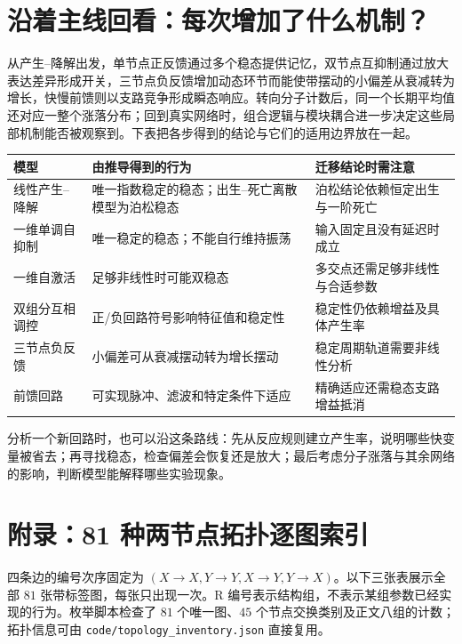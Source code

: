 \documentclass[11pt,a4paper,UTF8,fontset=fandol]{ctexart}
\begin{document}
\section{沿着主线回看：每次增加了什么机制？}
从产生--降解出发，单节点正反馈通过多个稳态提供记忆，双节点互抑制通过放大表达差异形成开关，三节点负反馈增加动态环节而能使带摆动的小偏差从衰减转为增长，快慢前馈则以支路竞争形成瞬态响应。转向分子计数后，同一个长期平均值还对应一整个涨落分布；回到真实网络时，组合逻辑与模块耦合进一步决定这些局部机制能否被观察到。下表把各步得到的结论与它们的适用边界放在一起。
\begin{center}\begin{tabular}{>{\raggedright\arraybackslash}p{3.1cm}>{\raggedright\arraybackslash}p{6cm}>{\raggedright\arraybackslash}p{5.6cm}}\toprule
模型 & 由推导得到的行为 & 迁移结论时需注意\\\midrule
线性产生--降解 & 唯一指数稳定的稳态；出生--死亡离散模型为泊松稳态 & 泊松结论依赖恒定出生与一阶死亡\\
一维单调自抑制 & 唯一稳定的稳态；不能自行维持振荡 & 输入固定且没有延迟时成立\\
一维自激活 & 足够非线性时可能双稳态 & 多交点还需足够非线性与合适参数\\
双组分互相调控 & 正/负回路符号影响特征值和稳定性 & 稳定性仍依赖增益及具体产生率\\
三节点负反馈 & 小偏差可从衰减摆动转为增长摆动 & 稳定周期轨道需要非线性分析\\
前馈回路 & 可实现脉冲、滤波和特定条件下适应 & 精确适应还需稳态支路增益抵消\\
\bottomrule\end{tabular}\end{center}

分析一个新回路时，也可以沿这条路线：先从反应规则建立产生率，说明哪些快变量被省去；再寻找稳态，检查偏差会恢复还是放大；最后考虑分子涨落与其余网络的影响，判断模型能解释哪些实验现象。

\clearpage
\section*{附录：81 种两节点拓扑逐图索引}
四条边的编号次序固定为 $(X\to X,Y\to Y,X\to Y,Y\to X)$。以下三张表展示全部 $81$ 张带标签图，每张只出现一次。R 编号表示结构组，不表示某组参数已经实现的行为。枚举脚本检查了 $81$ 个唯一图、$45$ 个节点交换类别及正文八组的计数；拓扑信息可由 \texttt{code/topology\_inventory.json} 直接复用。



\end{document}
